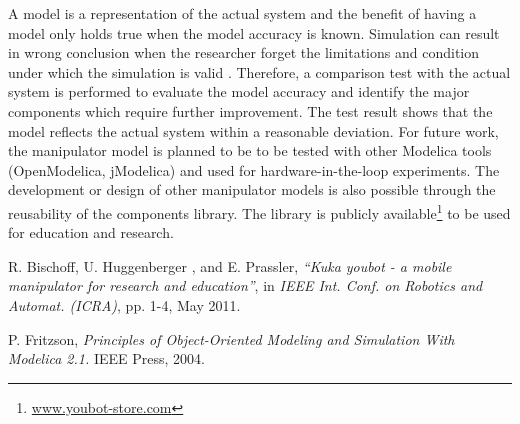 \documentclass[11pt,a4paper]{article}
\begin{document}
A model is a representation of the actual system and the benefit of having a model only holds true when the model accuracy is known. 
Simulation can result in wrong conclusion when the researcher forget the limitations and condition under which the simulation is valid \cite{Fritzon2004}.
Therefore, a comparison test with the actual system is performed to evaluate the model accuracy and identify the major components which require further improvement.
The test result shows that the model reflects the actual system within a reasonable deviation. 
For future work, the manipulator model is planned to be to be tested with other Modelica tools (OpenModelica, jModelica) and used for hardware-in-the-loop experiments.
The development or design of other manipulator models is also possible through the reusability of the components library. 
The library is publicly available\footnote{\href{http://www.youbot-store.com}{www.youbot-store.com}} to be used for education and research.


\begin{thebibliography}{00}

 R. Bischoff, U. Huggenberger
, and E. Prassler, \emph{``Kuka youbot - a mobile manipulator for research and education''}, in \emph{IEEE Int. Conf. on Robotics and Automat. (ICRA)}, pp. 1-4, May 2011.

 P. Fritzson, \emph{Principles of Object-Oriented Modeling and Simulation With Modelica 2.1.} IEEE Press, 2004.

\end{thebibliography}
\end{document}
